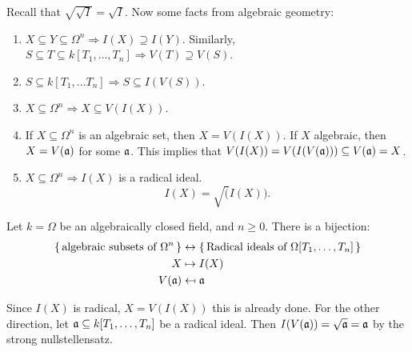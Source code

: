 \documentclass{article}
\begin{document}
\endproof
Recall that $\sqrt{\sqrt{I}} = \sqrt{I}$. Now some facts from algebraic geometry: 
\begin{enumerate}
    \item $X \subseteq Y \subseteq \Omega^{n} \Rightarrow I(X) \supseteq I(Y)$. \gap Similarly, $S \subseteq T \subseteq k[T_{1},\dots,T_{n}] \Rightarrow V(T) \supseteq V(S)$.
    \item $S \subseteq k[T_{1}, \dots T_{n}] \Rightarrow S \subseteq I(V(S))$.
    \item $X \subseteq \Omega^{n} \Rightarrow X \subseteq V(I(X))$.
    \item If $X \subseteq \Omega^{n}$ is an algebraic set, then $X = V(I(X))$. \proof If $X$ algebraic, then $X = V(\mathfrak{a})$ for some $\mathfrak{a}$. This implies that $V(I(X)) = V(I(V(\mathfrak{a}))) \subseteq V(\mathfrak{a}) =X$. \endproof 
    \item $X \subseteq \Omega^{n} \Rightarrow I(X)$ is a radical ideal. \[ I(X) = \sqrt(I(X)).\]
\end{enumerate}
\begin{fancyprop}{}
    Let $k = \Omega$ be an algebraically closed field, and $n \geq 0$. There is a bijection:
    \begin{align*}
        \{\, \text{algebraic subsets of $\Omega^{n}$}\,\} &\leftrightarrow \{\,\text{Radical ideals of $\Omega[T_{1}, \dots, T_{n}]$} \, \}\\
        X &\mapsto I(X)\\
        V(\mathfrak{a}) &\mapsfrom \mathfrak{a}
    \end{align*}
\end{fancyprop}
\proof Since $I(X)$ is radical, $X=V(I(X))$ this is already done. For the other direction, let $\mathfrak{a} \subseteq k[T_{1}, \dots, T_{n}]$ be a radical ideal. Then $I(V(\mathfrak{a})) = \sqrt{\mathfrak{a}} = \mathfrak{a}$ by the strong nullstellensatz. \endproof
\end{document}
